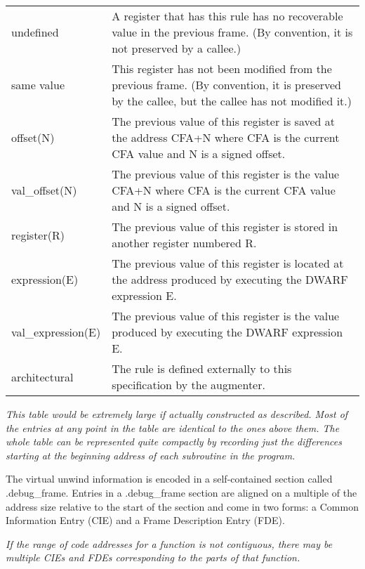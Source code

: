 \begin{tabular}{lp{8cm}}
undefined 
&A register that has this rule has no recoverable value in the previous frame.
(By convention, it is not preserved by a callee.) \\

same value
&This register has not been modified from the previous frame. (By convention,
it is preserved by the callee, but the callee has not modified it.) \\

offset(N)
&The previous value of this register is saved at the address CFA+N where CFA
is the current CFA value and N is a signed offset.\\

val\_offset(N)
&The previous value of this register is the value CFA+N where CFA is the
current CFA value and N is a signed offset.\\

register(R)
&The previous value of this register is stored 
in another register numbered R.\\

expression(E)
&The previous value of this register is located at the address produced by
executing the DWARF expression E.\\

val\_expression(E) 
&The previous value of this register is the value produced by executing the
DWARF expression E.\\

architectural
&The rule is defined externally to this specification by the augmenter.\\

\end{tabular}

\textit{This table would be extremely large if actually constructed
as described. Most of the entries at any point in the table
are identical to the ones above them. The whole table can be
represented quite compactly by recording just the differences
starting at the beginning address of each subroutine in
the program.}

The virtual unwind information is encoded in a self-contained
section called .debug\_frame.  Entries in a .debug\_frame section
are aligned on a multiple of the address size relative to
the start of the section and come in two forms: a Common
Information Entry (CIE) and a Frame Description Entry (FDE).

\textit{If the range of code addresses for a function is not
contiguous, there may be multiple CIEs and FDEs corresponding
to the parts of that function.}


